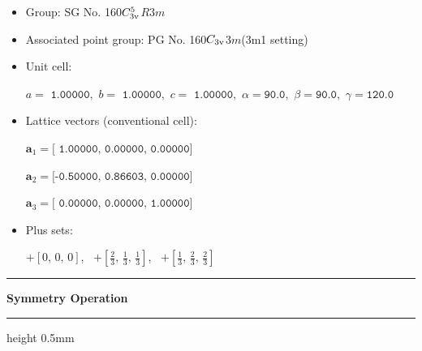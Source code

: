 \documentclass[fleqn,10pt,landscape]{jsarticle}
\begin{document}
\begin{itemize}
\item Group: SG No. 160\quad$C_{\rm 3v}^{5}$\quad$R3m$\quad[ trigonal ]
\item Associated point group: PG No. 160\quad$C_{\rm 3v}$\quad$3m$\quad(3m1 setting)\quad[ trigonal ]
\end{itemize}
\begin{itemize}
\item Unit cell:

\quad $a=\texttt{ 1.00000},\,\, b=\texttt{ 1.00000},\,\, c=\texttt{ 1.00000},\,\, \alpha=\texttt{90.0},\,\, \beta=\texttt{90.0},\,\, \gamma=\texttt{120.0}$

\item Lattice vectors (conventional cell):

\quad $\bm{a}_1=\texttt{[ 1.00000, 0.00000, 0.00000]}$

\quad $\bm{a}_2=\texttt{[-0.50000, 0.86603, 0.00000]}$

\quad $\bm{a}_3=\texttt{[ 0.00000, 0.00000, 1.00000]}$

\item Plus sets:

\quad $+\left[ 0,\, 0,\, 0 \right]$,\,\,\, $+\left[ \frac{2}{3},\, \frac{1}{3},\, \frac{1}{3} \right]$,\,\,\, $+\left[ \frac{1}{3},\, \frac{2}{3},\, \frac{2}{3} \right]$

\end{itemize}
\vspace{5mm}
\noindent \rule[0.5mm]{5mm}{0.5mm}\hspace{3mm}\textbf{Symmetry Operation}\hspace{3mm}\leaders\hrule height 0.5mm\hfill\kern0pt
\vspace{3mm}
\end{document}
